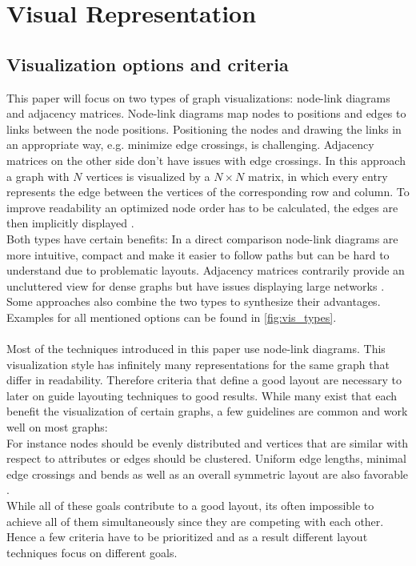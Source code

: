 \section{Visual Representation}
\subsection{Visualization options and criteria}
This paper will focus on two types of graph visualizations: node-link diagrams and adjacency matrices.
Node-link diagrams map nodes to positions and edges to links between the node positions. Positioning the nodes and drawing the links in an appropriate way, e.g. minimize edge crossings, is challenging. Adjacency matrices on the other side don't have issues with edge crossings. In this approach a graph with $N$ vertices is visualized by a $N \times N $ matrix, in which every entry represents the edge between the vertices of the corresponding row and column. To improve readability an optimized node order has to be calculated, the edges are then implicitly displayed \cite{VonLandesberger2011}.\\
Both types have certain benefits: In a direct comparison node-link diagrams are more intuitive, compact and make it easier to follow paths but can be hard to understand due to problematic layouts. Adjacency matrices contrarily provide an uncluttered view for dense graphs but have issues displaying large networks \cite{Ghoniem2004}. Some approaches also combine the two types to synthesize their advantages. Examples for all mentioned options can be found in \autoref{fig:vis_types}.
\\\\
Most of the techniques introduced in this paper use node-link diagrams. This visualization style has infinitely many representations for the same graph that differ in readability. Therefore criteria that define a good layout are necessary to later on guide layouting techniques to good results. While many exist that each benefit the visualization of certain graphs, a few guidelines are common and work well on most graphs: \\
For instance nodes should be evenly distributed and vertices that are similar with respect to attributes or edges should be clustered. Uniform edge lengths, minimal edge crossings and bends as well as an overall symmetric layout are also favorable \cite{Bennett2007}. \\
While all of these goals contribute to a good layout, its often impossible to achieve all of them simultaneously since they are competing with each other\cite{Gibson2013}. Hence a few criteria have to be prioritized and as a result different layout techniques focus on different goals.
